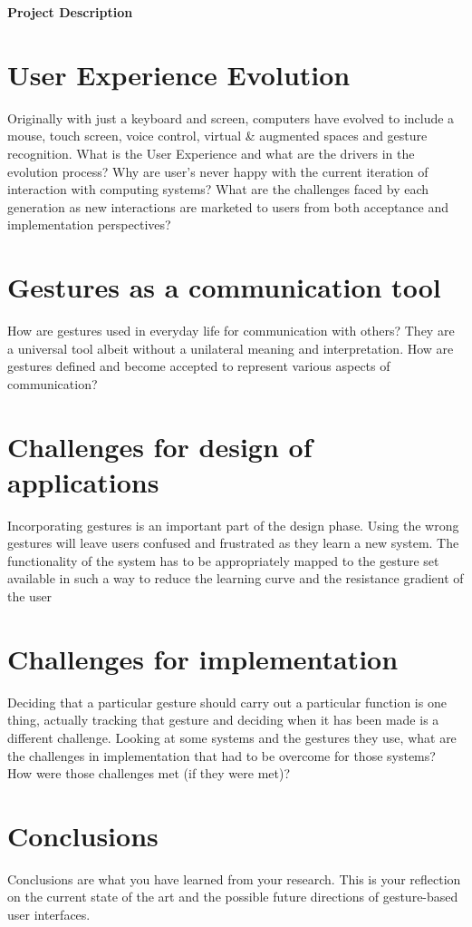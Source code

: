 \documentclass{article}
\begin{document}
\textbf{Project Description}

\section{User Experience Evolution}
Originally with just a keyboard and screen, computers have evolved to
include a mouse, touch screen, voice control, virtual & augmented spaces and gesture recognition.
What is the User Experience and what are the drivers in the evolution process? Why are user’s
never happy with the current iteration of interaction with computing systems? What are the
challenges faced by each generation as new interactions are marketed to users from both
acceptance and implementation perspectives?

\section{Gestures as a communication tool}
How are gestures used in everyday life for communication with
others? They are a universal tool albeit without a unilateral meaning and interpretation. How are
gestures defined and become accepted to represent various aspects of communication?

\section{Challenges for design of applications}
Incorporating gestures is an important part of the design
phase. Using the wrong gestures will leave users confused and frustrated as they learn a new
system. The functionality of the system has to be appropriately mapped to the gesture set available in such a way to reduce the learning curve and the resistance gradient of the user


\section{Challenges for implementation}
Deciding that a particular gesture should carry out a particular
function is one thing, actually tracking that gesture and deciding when it has been made is a
different challenge. Looking at some systems and the gestures they use, what are the challenges in
implementation that had to be overcome for those systems? How were those challenges met (if
they were met)?

\section{Conclusions}
Conclusions are what you have learned from your research. This is your reflection on
the current state of the art and the possible future directions of gesture-based user interfaces.
\end{document}
